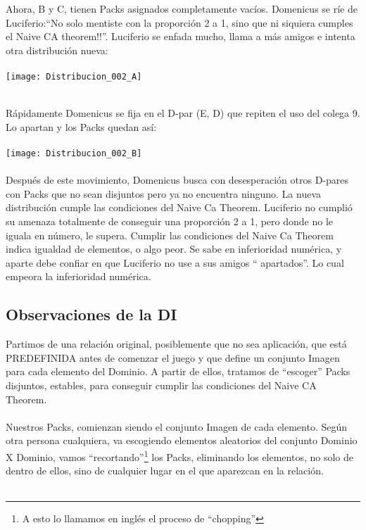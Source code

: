 	\noindent
	Ahora, B y C, tienen Packs asignados completamente vacíos. Domenicus se ríe de Luciferio:``No solo mentiste con la proporción 2 a 1, sino que ni siquiera cumples el Naive CA theorem!!''. Luciferio se enfada mucho, llama a más amigos e intenta otra distribución nueva:
	\\\\
	
	\noindent
	\texttt{[image: Distribucion\_002\_A]}
	\\\\
	
	\newpage
	

	\noindent
	Rápidamente Domenicus se fija en el D-par (E, D) que repiten el uso del colega 9. Lo apartan y los Packs quedan así:\\\\
	\texttt{[image: Distribucion\_002\_B]}
	\\\\
	
	\noindent
	Después de este movimiento, Domenicus busca con desesperación otros D-pares con Packs que no sean disjuntos pero ya no encuentra ninguno. La nueva distribución cumple las condiciones del Naive Ca Theorem. Luciferio no cumplió su amenaza totalmente de conseguir una proporción 2 a 1, pero donde no le iguala en número, le supera. Cumplir las condiciones del Naive Ca Theorem indica igualdad de elementos, o algo peor. Se sabe en inferioridad numérica, y aparte debe confiar en que Luciferio no use a sus amigos `` apartados''. Lo cual empeora la inferioridad numérica.
	
	\subsection{Observaciones de la DI}
	
	\noindent
	Partimos de una relación original, posiblemente que no sea aplicación, que está PREDEFINIDA antes de comenzar el juego y que define un conjunto Imagen para cada elemento del Dominio. A partir de ellos, tratamos de ``escoger'' Packs disjuntos, estables, para conseguir cumplir las condiciones del Naive CA Theorem.
	\\\\
	
	\noindent
	Nuestros Packs, comienzan siendo el conjunto Imagen de cada elemento. Según otra persona cualquiera, va escogiendo elementos aleatorios del conjunto Dominio X Dominio, vamos ``recortando''\footnote{A esto lo llamamos en inglés el proceso de ``chopping''} los Packs, eliminando los elementos, no solo de dentro de ellos, sino de cualquier lugar en el que aparezcan en la relación.
	\\\\
	
